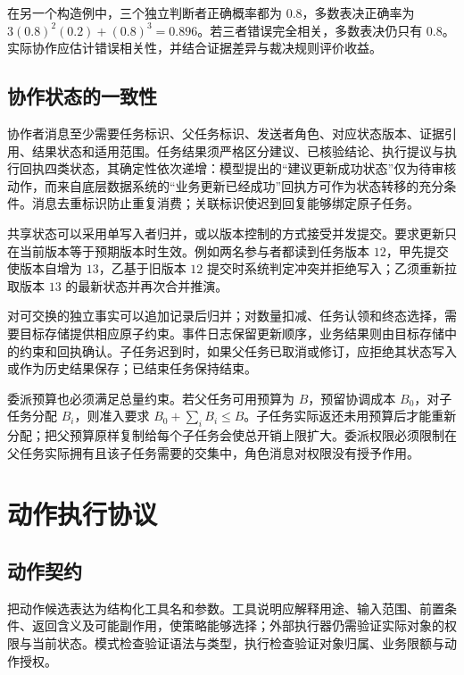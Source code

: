 \documentclass[../textbook.tex]{subfiles}
\begin{document}
在另一个构造例中，三个独立判断者正确概率都为 $0.8$，多数表决正确率为 $3(0.8)^2(0.2)+(0.8)^3=0.896$。若三者错误完全相关，多数表决仍只有 $0.8$。实际协作应估计错误相关性，并结合证据差异与裁决规则评价收益。

\subsection{协作状态的一致性}
协作者消息至少需要任务标识、父任务标识、发送者角色、对应状态版本、证据引用、结果状态和适用范围。任务结果须严格区分建议、已核验结论、执行提议与执行回执四类状态，其确定性依次递增：模型提出的“建议更新成功状态”仅为待审核动作，而来自底层数据系统的“业务更新已经成功”回执方可作为状态转移的充分条件。消息去重标识防止重复消费；关联标识使迟到回复能够绑定原子任务。

共享状态可以采用单写入者归并，或以版本控制的方式接受并发提交。要求更新只在当前版本等于预期版本时生效。例如两名参与者都读到任务版本 $12$，甲先提交使版本自增为 $13$，乙基于旧版本 $12$ 提交时系统判定冲突并拒绝写入；乙须重新拉取版本 $13$ 的最新状态并再次合并推演。


对可交换的独立事实可以追加记录后归并；对数量扣减、任务认领和终态选择，需要目标存储提供相应原子约束。事件日志保留更新顺序，业务结果则由目标存储中的约束和回执确认。子任务迟到时，如果父任务已取消或修订，应拒绝其状态写入或作为历史结果保存；已结束任务保持结束。

委派预算也必须满足总量约束。若父任务可用预算为 $B$，预留协调成本 $B_0$，对子任务分配 $B_i$，则准入要求 $B_0+\sum_iB_i\le B$。子任务实际返还未用预算后才能重新分配；把父预算原样复制给每个子任务会使总开销上限扩大。委派权限必须限制在父任务实际拥有且该子任务需要的交集中，角色消息对权限没有授予作用。

\section{动作执行协议}

\subsection{动作契约}
把动作候选表达为结构化工具名和参数。工具说明应解释用途、输入范围、前置条件、返回含义及可能副作用，使策略能够选择；外部执行器仍需验证实际对象的权限与当前状态。模式检查验证语法与类型，执行检查验证对象归属、业务限额与动作授权。
\end{document}
